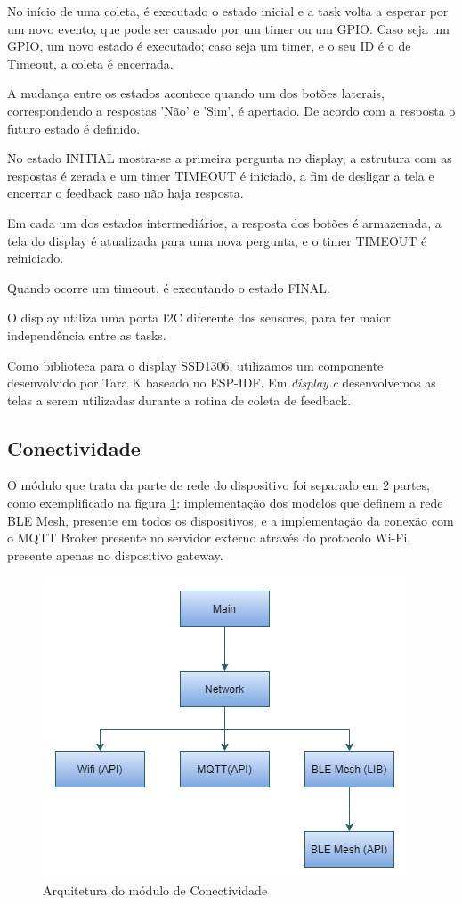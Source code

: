 \documentclass[../monografia.tex]{subfiles}
\begin{document}
No início de uma coleta, é executado o estado inicial e a task volta a esperar por um novo evento, que pode ser causado por um timer ou um GPIO. Caso seja um GPIO, um novo estado é executado; caso seja um timer, e o seu ID é o de Timeout, a coleta é encerrada.

A mudança entre os estados acontece quando um dos botões laterais, correspondendo a respostas 'Não' e 'Sim', é apertado. De acordo com a resposta o futuro estado é definido. 

No estado INITIAL mostra-se a primeira pergunta no display, a estrutura com as respostas é zerada e um timer TIMEOUT é iniciado, a fim de desligar a tela e encerrar o feedback caso não haja resposta. 

Em cada um dos estados intermediários, a resposta dos botões é armazenada, a tela do display é atualizada para uma nova pergunta, e o timer TIMEOUT é reiniciado. 

Quando ocorre um timeout, é executando o estado FINAL. 

O display utiliza uma porta I2C diferente dos sensores, para ter maior independência entre as tasks.

Como biblioteca para o display SSD1306, utilizamos um componente desenvolvido por Tara K\cite{TaraK} baseado no ESP-IDF\cite{SSD1306}. Em \textit{display.c} desenvolvemos as telas a serem utilizadas durante a rotina de coleta de feedback. 


\subsection{Conectividade}

O módulo que trata da parte de rede do dispositivo foi separado em 2 partes, como exemplificado na figura \ref{fig:netw-arch}: implementação dos modelos que definem a rede BLE Mesh, presente em todos os dispositivos, e a implementação da conexão com o MQTT Broker presente no servidor externo através do protocolo Wi-Fi, presente apenas no dispositivo gateway.

\begin{figure}[h!]
	\centering
	\includegraphics[scale=0.8]{netw-arch}
	\caption{Arquitetura do módulo de Conectividade} %
	\label{fig:netw-arch}
\end{figure}
\end{document}
